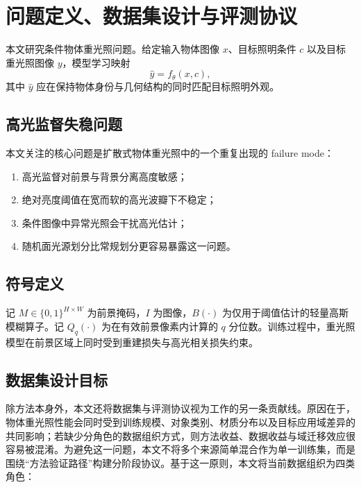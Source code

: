 \documentclass[UTF8,a4paper]{ctexart}
\begin{document}
\section{问题定义、数据集设计与评测协议}

本文研究条件物体重光照问题。给定输入物体图像 $x$、目标照明条件 $c$ 以及目标重光照图像 $y$，模型学习映射
\begin{equation}
\hat{y} = f_{\theta}(x, c),
\end{equation}
其中 $\hat{y}$ 应在保持物体身份与几何结构的同时匹配目标照明外观。

\subsection{高光监督失稳问题}

本文关注的核心问题是扩散式物体重光照中的一个重复出现的 failure mode：

\begin{enumerate}
\item 高光监督对前景与背景分离高度敏感；
\item 绝对亮度阈值在宽而软的高光波瓣下不稳定；
\item 条件图像中异常光照会干扰高光估计；
\item 随机面光源划分比常规划分更容易暴露这一问题。
\end{enumerate}

\subsection{符号定义}

记 $M \in \{0,1\}^{H \times W}$ 为前景掩码，$I$ 为图像，$B(\cdot)$ 为仅用于阈值估计的轻量高斯模糊算子。记 $Q_q(\cdot)$ 为在有效前景像素内计算的 $q$ 分位数。训练过程中，重光照模型在前景区域上同时受到重建损失与高光相关损失约束。

\subsection{数据集设计目标}

除方法本身外，本文还将数据集与评测协议视为工作的另一条贡献线。原因在于，物体重光照性能会同时受到训练规模、对象类别、材质分布以及目标应用域差异的共同影响；若缺少分角色的数据组织方式，则方法收益、数据收益与域迁移效应很容易被混淆。为避免这一问题，本文不将多个来源简单混合作为单一训练集，而是围绕“方法验证路径”构建分阶段协议。基于这一原则，本文将当前数据组织为四类角色：
\end{document}

